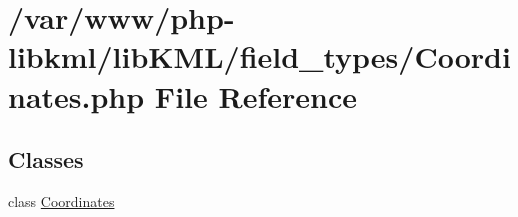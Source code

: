 \hypertarget{Coordinates_8php}{
\section{/var/www/php-\/libkml/libKML/field\_\-types/Coordinates.php File Reference}
\label{d0/d9d/Coordinates_8php}
}
\subsection*{Classes}
\begin{DoxyCompactItemize}
\item 
class \hyperlink{classCoordinates}{Coordinates}
\end{DoxyCompactItemize}
